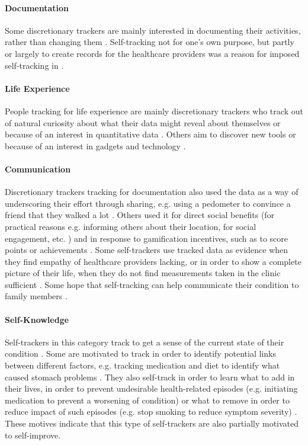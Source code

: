 \paragraph{Documentation}
Some discretionary trackers are mainly interested in documenting their activities, rather than changing them \citep{Rooksby2014}. Self-tracking not for one's own purpose, but partly or largely to create records for the healthcare providers was a reason for imposed self-tracking in \citep{Ancker2015}. 

\paragraph{Life Experience} 
People tracking for life experience are mainly discretionary trackers who track out of natural curiosity about what their data might reveal about themselves \citep{Li2010, Epstein2015} or because of an interest in quantitative data \citep{Li2010, Rooksby2014}. Others aim to discover new tools or because of an interest in gadgets and technology \citep{Li2010, Rooksby2014}. 

\paragraph{Communication} 
Discretionary trackers tracking for documentation also used the data as a way of underscoring their effort through sharing, e.g. using a pedometer to convince a friend that they walked a lot \citep{Rooksby2014}. Others used it for direct social benefits (for practical reasons e.g. informing others about their location, for social engagement, etc. \citep{Epstein2015}) and in response to gamification incentives, such as to score points or achievements \citep{Rooksby2014}. Some self-trackers use tracked data as evidence when they find empathy of healthcare providers lacking, or in order to show a complete picture of their life, when they do not find measurements taken in the clinic sufficient \citep{Chung2016}. Some hope that self-tracking can help communicate their condition to family members \citep{MacLeod2014}. 

\paragraph{Self-Knowledge} \label{selfknowledge}
Self-trackers in this category track to get a sense of the current state of their condition \citep{MacLeod2014, Ancker2015}. Some are motivated to track in order to identify potential links between different factors, e.g. tracking medication and diet to identify what caused stomach problems \citep{Rooksby2014}. They also self-track in order to learn what to add in their lives, in order to prevent undesirable health-related episodes (e.g. initiating medication to prevent a worsening of condition) or what to remove in order to reduce impact of such episodes (e.g. stop smoking to reduce symptom severity) \citep{MacLeod2014}. These motives indicate that this type of self-trackers are also partially motivated to self-improve. 

